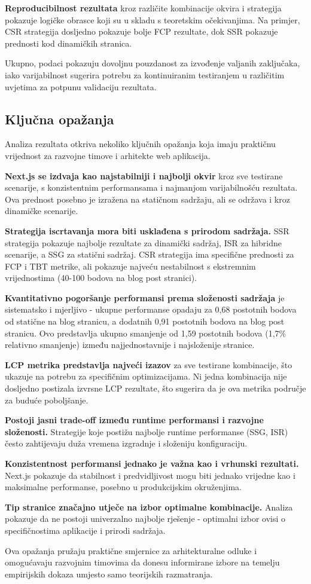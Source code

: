 \textbf{Reproducibilnost rezultata} kroz različite kombinacije okvira i strategija pokazuje logičke obrasce koji su u skladu s teoretskim očekivanjima. Na primjer, CSR strategija dosljedno pokazuje bolje FCP rezultate, dok SSR pokazuje prednosti kod dinamičkih stranica.

Ukupno, podaci pokazuju dovoljnu pouzdanost za izvođenje valjanih zaključaka, iako varijabilnost sugerira potrebu za kontinuiranim testiranjem u različitim uvjetima za potpunu validaciju rezultata.

\subsection{Ključna opažanja}

Analiza rezultata otkriva nekoliko ključnih opažanja koja imaju praktičnu vrijednost za razvojne timove i arhitekte web aplikacija.

\textbf{Next.js se izdvaja kao najstabilniji i najbolji okvir} kroz sve testirane scenarije, s konzistentnim performansama i najmanjom varijabilnošću rezultata. Ova prednost posebno je izražena na statičnom sadržaju, ali se održava i kroz dinamičke scenarije.

\textbf{Strategija iscrtavanja mora biti usklađena s prirodom sadržaja.} SSR strategija pokazuje najbolje rezultate za dinamički sadržaj, ISR za hibridne scenarije, a SSG za statični sadržaj. CSR strategija ima specifične prednosti za FCP i TBT metrike, ali pokazuje najveću nestabilnost s ekstremnim vrijednostima (40-100 bodova na blog post stranici).

\textbf{Kvantitativno pogoršanje performansi prema složenosti sadržaja} je sistematsko i mjerljivo - ukupne performanse opadaju za 0,68 postotnih bodova od statične na blog stranicu, a dodatnih 0,91 postotnih bodova na blog post stranicu. Ovo predstavlja ukupno smanjenje od 1,59 postotnih bodova (1,7\% relativno smanjenje) između najjednostavnije i najsloženije stranice.

\textbf{LCP metrika predstavlja najveći izazov} za sve testirane kombinacije, što ukazuje na potrebu za specifičnim optimizacijama. Ni jedna kombinacija nije dosljedno postizala izvrsne LCP rezultate, što sugerira da je ova metrika područje za buduće poboljšanje.

\textbf{Postoji jasni trade-off između runtime performansi i razvojne složenosti.} Strategije koje postižu najbolje runtime performanse (SSG, ISR) često zahtijevaju duža vremena izgradnje i složeniju konfiguraciju.

\textbf{Konzistentnost performansi jednako je važna kao i vrhunski rezultati.} Next.js pokazuje da stabilnost i predvidljivost mogu biti jednako vrijedne kao i maksimalne performanse, posebno u produkcijskim okruženjima.

\textbf{Tip stranice značajno utječe na izbor optimalne kombinacije.} Analiza pokazuje da ne postoji univerzalno najbolje rješenje - optimalni izbor ovisi o specifičnostima aplikacije i prirodi sadržaja.

Ova opažanja pružaju praktične smjernice za arhitekturalne odluke i omogućavaju razvojnim timovima da donesu informirane izbore na temelju empirijskih dokaza umjesto samo teorijskih razmatranja.
